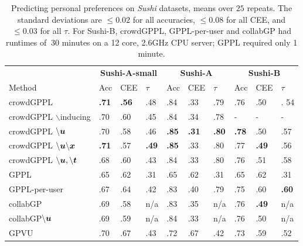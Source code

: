 \begin{table}
 \centering
 \small
 \setlength{\tabcolsep}{4pt}
 \begin{tabular}{l l l l@{\hskip 0.5cm} l l l@{\hskip 0.5cm} l l l}
\toprule
& \multicolumn{3}{c}{\textbf{Sushi-A-small}} & \multicolumn{3}{c}{\textbf{Sushi-A}} & \multicolumn{3}{c}{\textbf{Sushi-B}} \\ 
Method & Acc & CEE & $\tau$ & Acc & CEE & $\tau$ & Acc & CEE & $\tau$ \\
\midrule
crowdGPPL & \textbf{.71} & \textbf{.56} & .48 
& .84 & .33 & .79
& .76 & .50 & . 54
 \\
crowdGPPL $\backslash $inducing & .70 & .60 & .45 
& .84 & .34 & .78 
& - & - & - 
\\
crowdGPPL $\backslash  \boldsymbol u$ & .70 & .58 & .46 & 
\textbf{.85} & \textbf{.31} & \textbf{.80} 
& \textbf{.78} & .50 & .57 
\\
crowdGPPL $\backslash  \boldsymbol u \backslash  \boldsymbol x$ & \textbf{.71} & .57 & \textbf{.49} &
\textbf{.85} & .33 & .80 
& .77 & \textbf{.49} & .56 
\\
crowdGPPL $\backslash \boldsymbol u,\backslash \boldsymbol t$ 
& .68 & .60 & .43 
& .84 & .33 & .80
& .76 & .51 & .58
\\ 
\midrule 
GPPL & .65 & .62 & .31
& .65 & .62 & .31
& .65 & .62 & .31
\\
GPPL-per-user & .67 & .64 & .42
& .83 & .40 & .79 
& .75 & .60 & \textbf{.60} 
\\
collabGP & .69 & .58 & n/a 
& .83 & .35 & n/a
& .76 & \textbf{.49} & n/a
\\
collabGP$\backslash  \boldsymbol u$ & .69 & .59 & n/a & .84 & .33 & n/a & .76 & .50 & n/a
\\
GPVU & .70 & .67 & .43 & .72 & .67 & .42 & .73 & .59 & .52
\\ \bottomrule
\end{tabular}
\caption{Predicting personal preferences on \emph{Sushi} datasets,
means over $25$ repeats. 
The standard deviations are $\leq 0.02$ for all accuracies, 
$\leq 0.08$ for all CEE, 
and $\leq 0.03$ for all $\tau$.
For Sushi-B, crowdGPPL, GPPL-per-user and collabGP had runtimes of $~30$ minutes on a 12 core, 2.6GHz CPU server; GPPL required only 1 minute.
 }
\label{tab:sushi}
\end{table}

